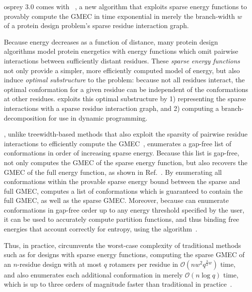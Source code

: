 \def\Oh{$\mathcal{O}$}

{\sc osprey} 3.0 comes with {\bwmstar}~\cite{BWM*}, a new algorithm that exploits sparse energy functions to provably compute the GMEC in time exponential in merely the branch-width $w$ of a protein design problem's sparse residue interaction graph.

Because energy decreases as a function of distance, many protein design algorithms model protein energetics with energy functions which omit pairwise interactions between sufficiently distant residues. These \emph{sparse energy functions} not only provide a simpler, more efficiently computed model of energy, but also induce \emph{optimal substructure} to the problem: because not all residues interact, the optimal conformation for a given residue can be independent of the conformations at other residues. {\bwmstar} exploits this optimal substructure by 1) representing the sparse interactions with a sparse residue interaction graph, and 2) computing a branch-decomposition for use in dynamic programming. 

{\bwmstar}, unlike treewidth-based methods that also exploit the sparsity of pairwise residue interactions to efficiently compute the GMEC~\cite{treewidth}, enumerates a gap-free list of conformations in order of increasing sparse energy. Because this list is gap-free, {\bwmstar} not only computes the GMEC of the sparse energy function, but also recovers the GMEC of the full energy function, as shown in Ref.~. By enumerating all conformations within the provable sparse energy bound between the sparse and full GMEC, {\bwmstar} computes a list of conformations which is guaranteed to contain the full GMEC, as well as the sparse GMEC.  Moreover, because {\bwmstar} can enumerate conformations in gap-free order up to any energy threshold specified by the user, it can be used to accurately compute partition functions, and thus binding free energies that account correctly for entropy, using the \ks algorithm~\cite{K*,minDEE}.  

Thus, in practice, {\bwmstar} circumvents the worst-case complexity of traditional methods such as \as for designs with sparse energy functions, computing the sparse GMEC of an $n$-residue design with at most $q$ rotamers per residue in \Oh$(nw^2q^{\frac{3}{2}w})$ time, and also enumerates each additional conformation in merely \Oh$(n\log q)$ time, which is up to three orders of magnitude faster than traditional \as in practice~\cite{BWM*}.